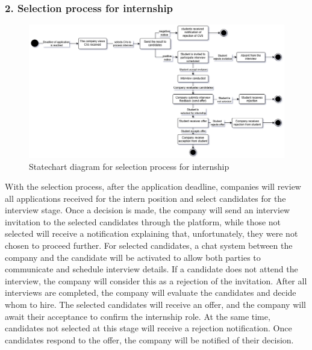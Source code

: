 \subsubsection{2. Selection process for internship}\label{subsubsec:internship_feedback}
\begin{figure}[H]
    \centering
    \includegraphics[width=1\textwidth]{Images/Selection_process.png}
    \caption{Statechart diagram for selection process for internship}\label{fig:statechart_selection_process_for_internship}
\end{figure}
With the selection process, after the application deadline, companies will review all applications received for the intern position and select 
candidates for the interview stage. Once a decision is made, the company will send an interview invitation to the selected candidates through 
the platform, while those not selected will receive a notification explaining that, unfortunately, they were not chosen to proceed further.
For selected candidates, a chat system between the company and the candidate will be activated to allow both parties to communicate and schedule 
interview details. If a candidate does not attend the interview, the company will consider this as a rejection of the invitation.
After all interviews are completed, the company will evaluate the candidates and decide whom to hire. The selected candidates will receive an offer, 
and the company will await their acceptance to confirm the internship role. At the same time, candidates not selected at this stage will receive a 
rejection notification. Once candidates respond to the offer, the company will be notified of their decision.

